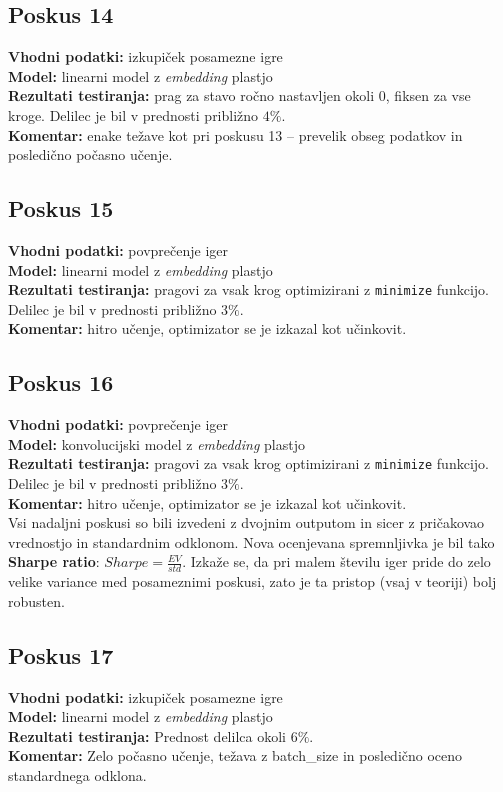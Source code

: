 \documentclass[a4paper,12pt]{article}
\begin{document}
\subsection{Poskus 14}
\textbf{Vhodni podatki:} izkupiček posamezne igre \\
\textbf{Model:} linearni model z \textit{embedding} plastjo \\
\textbf{Rezultati testiranja:} prag za stavo ročno nastavljen okoli $0$, fiksen za vse kroge. Delilec je bil v prednosti približno $4\%$. \\
\textbf{Komentar:} enake težave kot pri poskusu 13 – prevelik obseg podatkov in posledično počasno učenje.

\subsection{Poskus 15}
\textbf{Vhodni podatki:} povprečenje iger \\
\textbf{Model:} linearni model z \textit{embedding} plastjo \\
\textbf{Rezultati testiranja:} pragovi za vsak krog optimizirani z \texttt{minimize} funkcijo. 
Delilec je bil v prednosti približno $3\%$. \\
\textbf{Komentar:} hitro učenje, optimizator se je izkazal kot učinkovit.

\subsection{Poskus 16}
\textbf{Vhodni podatki:} povprečenje iger \\
\textbf{Model:} konvolucijski model z \textit{embedding} plastjo \\
\textbf{Rezultati testiranja:} pragovi za vsak krog optimizirani z \texttt{minimize} funkcijo. 
Delilec je bil v prednosti približno $3\%$. \\
\textbf{Komentar:} hitro učenje, optimizator se je izkazal kot učinkovit. \\

\vspace{0.5cm}
\noindent
Vsi nadaljni poskusi so bili izvedeni z dvojnim outputom in sicer z pričakovao vrednostjo in standardnim odklonom.
Nova ocenjevana spremnljivka je bil tako \textbf{Sharpe ratio}: $Sharpe = \frac{EV}{std}.$ Izkaže se, da pri malem številu iger pride do
zelo velike variance med posameznimi poskusi, zato je ta pristop (vsaj v teoriji) bolj robusten.

\subsection{Poskus 17}
\textbf{Vhodni podatki:} izkupiček posamezne igre \\
\textbf{Model:} linearni model z \textit{embedding} plastjo \\
\textbf{Rezultati testiranja:} Prednost delilca okoli $6\%$. \\
\textbf{Komentar:} Zelo počasno učenje, težava z batch_size in posledično oceno standardnega odklona.
\end{document}

